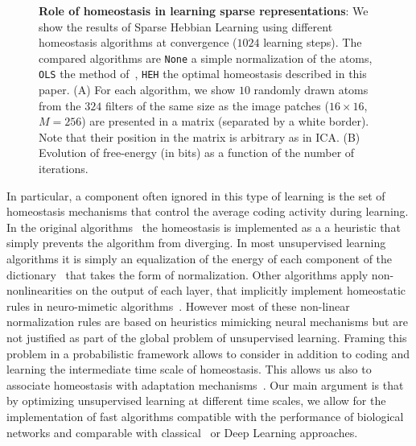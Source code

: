 \documentclass[a4paper, 11pt, draft]{article} %
\begin{document}
\begin{figure}%
\caption{
{\bf Role of homeostasis in learning sparse representations}:
We show the results of Sparse Hebbian Learning using different homeostasis algorithms at convergence ($1024$ learning steps). The compared algorithms are \texttt{None} a simple normalization of the atoms, \texttt{OLS} the method of~\citep{Olshausen97}, \texttt{HEH} the optimal homeostasis described in this paper. {\sf (A)} For each algorithm, we show $10$ randomly drawn atoms from the $324$ filters of the same size as the image patches ($16 \times 16$, $M=256$) are presented in a matrix (separated by a white border). Note that their position in the matrix is arbitrary as in ICA. {\sf (B)} Evolution of free-energy (in bits) as a function of the number of iterations. %
\label{fig:map}}%
\end{figure}%
In particular, a component often ignored in this type of learning is the set of homeostasis mechanisms that control the average coding activity during learning. %
In the original algorithms~\citep{Olshausen97} the homeostasis is implemented as a a heuristic that simply prevents the algorithm from diverging. In most unsupervised learning algorithms it is simply an equalization of the energy of each component of the dictionary~\citep{Mairal11} that takes the form of  normalization. Other algorithms apply non-nonlinearities on the output of each layer, that implicitly implement homeostatic rules in neuro-mimetic algorithms~\citep{Brito16}. However most of these non-linear normalization rules are based on heuristics mimicking neural mechanisms but are not justified as part of the global problem of unsupervised learning.  Framing this problem in a probabilistic framework allows to consider in addition to coding and learning the intermediate time scale of homeostasis. This allows us also to associate homeostasis with adaptation mechanisms~\citep{Rao99}. Our main argument is that by optimizing unsupervised learning at different time scales, we allow for the implementation of fast algorithms compatible with the performance of biological networks and comparable with classical~\citep{Olshausen97} or Deep Learning approaches.
\end{document}
